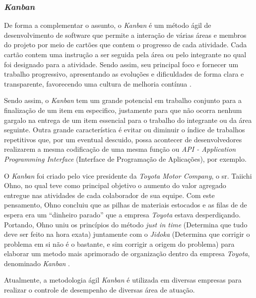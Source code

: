 \subsubsection{\textit{\textit{Kanban}}}

De forma a complementar o assunto, o \textit{Kanban} é um método ágil de desenvolvimento de software que permite a interação de várias áreas e membros do projeto por meio de cartões que contem o progresso de cada atividade. Cada cartão contem uma instrução a ser seguida pela área ou pelo integrante no qual foi designado para a atividade. Sendo assim, seu principal foco e fornecer um trabalho progressivo, apresentando as evoluções e dificuldades de forma clara e transparente, favorecendo uma cultura de melhoria contínua \cite{KANBAN2014}.

Sendo assim, o \textit{Kanban} tem um grande potencial em trabalho conjunto para a finalização de um item em especifico, justamente para que não ocorra nenhum gargalo na entrega de um item essencial para o trabalho do integrante ou da área seguinte. Outra grande característica é evitar ou diminuir o índice de trabalhos repetitivos que, por um eventual descuido, possa acontecer de desenvolvedores realizarem a mesma codificação de uma mesma função ou \textit{API - Application Programming Interface} (Interface de Programação de Aplicações), por exemplo.

O \textit{Kanban} foi criado pelo vice presidente da \textit{Toyota Motor Company}, o sr. Taiichi Ohno, no qual teve como principal objetivo o aumento do valor agregado entregue nas atividades de cada colaborador de sua equipe. Com este pensamento,  Ohno concluiu que as pilhas de materiais estocados e as filas de de espera era um “dinheiro parado” que a empresa \textit{Toyota} estava desperdiçando. Portando,   Ohno uniu os princípios do método \textit{just in time} (Determina que tudo deve ser feito na hora exata)  juntamente com o \textit{Jidoka} (Determina que corrigir o problema em si não é o bastante, e sim corrigir a origem do problema) para elaborar um metodo mais aprimorado de organização dentro da empresa \textit{Toyota}, denominado \textit{Kanban} \cite{TOYOTA1977}.

Atualmente, a metodologia ágil \textit{Kanban} é utilizada em diversas empresas para realizar o controle de desempenho de diversas área de atuação.